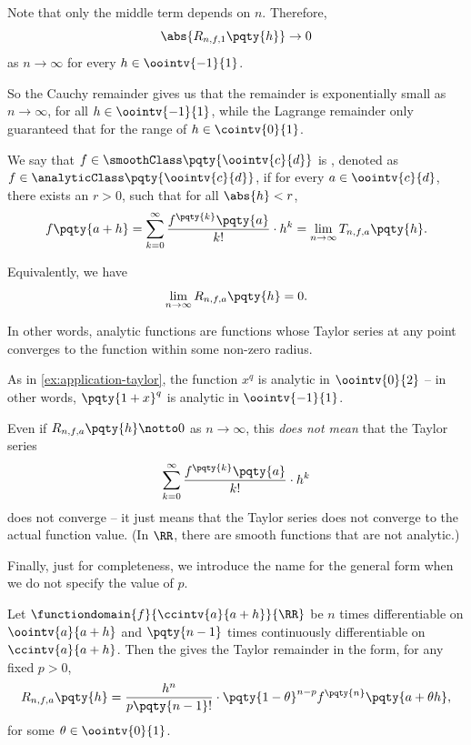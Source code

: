 \begin{example}
    Note that only the middle term depends on \(n\). Therefore,
    \[
        \abs{R_{n, f, 1} \pqty{h}} \to 0
    \]
    as \(n \to \infty\) for every \(h \in \oointv{-1}{1}\).
    
    So the Cauchy remainder gives us that the remainder is exponentially small as \(n \to \infty\), for all \(h \in \oointv{-1}{1}\), while the Lagrange remainder only guaranteed that for the range of \(h \in \cointv{0}{1}\).
\end{example}

\begin{definition}
    \label{def:analytic}%
    We say that \(f \in \smoothClass \pqty{\oointv{c}{d}}\) is , denoted as \(f \in \analyticClass \pqty{\oointv{c}{d}}\), if for every \(a \in \oointv{c}{d}\), there exists an \(r > 0\), such that for all \(\abs{h} < r\),
    \[
        f\pqty{a + h} = \sum_{k = 0}^{\infty} \frac{f^{\pqty{k}} \pqty{a}}{k!} \cdot h^k = \lim_{n \to \infty} T_{n, f, a} \pqty{h}.
    \]

    Equivalently, we have
    \[
        \lim_{n \to \infty} R_{n, f, a} \pqty{h} = 0.
    \]

    In other words, analytic functions are functions whose Taylor series at any point converges to the function within some non-zero radius.
\end{definition}

\begin{example}
    \label{ex:analytic-fn}%
    As in \autoref{ex:application-taylor}, the function \(x^q\) is analytic in \(\oointv{0}{2}\) -- in other words, \(\pqty{1 + x}^q\) is analytic in \(\oointv{-1}{1}\).
\end{example}

\begin{remark}
    Even if \(R_{n, f, a} \pqty{h} \notto 0\) as \(n \to \infty\), this \emph{does not mean} that the Taylor series
    \[
        \sum_{k = 0}^{\infty} \frac{f^{\pqty{k}} \pqty{a}}{k!} \cdot h^k
    \]
    does not converge -- it just means that the Taylor series does not converge to the actual function value. (In \(\RR\), there are smooth functions that are not analytic.)
\end{remark}

Finally, just for completeness, we introduce the name for the general form when we do not specify the value of \(p\).

\begin{theorem}
    \label{thm:taylor-thm-schlomilch-remainder}%
    Let \(\functiondomain{f}{\ccintv{a}{a + h}}{\RR}\) be \(n\) times differentiable on \(\oointv{a}{a + h}\) and \(\pqty{n - 1}\) times continuously differentiable on \(\ccintv{a}{a + h}\). Then the  gives the Taylor remainder in the form, for any fixed \(p > 0\),
    \[
        R_{n, f, a} \pqty{h} = \frac{h^{n}}{p \pqty{n - 1}!} \cdot \pqty{1 - \theta}^{n - p} f^{\pqty{n}} \pqty{a + \theta h},
    \]
    for some \(\theta \in \oointv{0}{1}\).
\end{theorem}

